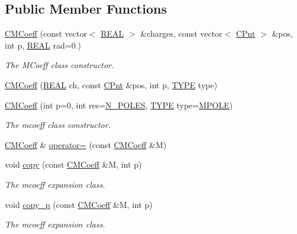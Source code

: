 \subsection*{Public Member Functions}
\begin{DoxyCompactItemize}
\item 
\hyperlink{classCMCoeff_aee6ebc4dd1ad9096babcaba957db66c7}{C\-M\-Coeff} (const vector$<$ \hyperlink{util_8h_a5821460e95a0800cf9f24c38915cbbde}{R\-E\-A\-L} $>$ \&charges, const vector$<$ \hyperlink{classCPnt}{C\-Pnt} $>$ \&pos, int p, \hyperlink{util_8h_a5821460e95a0800cf9f24c38915cbbde}{R\-E\-A\-L} rad=0.)
\begin{DoxyCompactList}\small\item\em The M\-Coeff class constructor. \end{DoxyCompactList}\item 
\hyperlink{classCMCoeff_a44f54126d3f90484420f1baf14ed491f}{C\-M\-Coeff} (\hyperlink{util_8h_a5821460e95a0800cf9f24c38915cbbde}{R\-E\-A\-L} ch, const \hyperlink{classCPnt}{C\-Pnt} \&pos, int p, \hyperlink{classCMCoeff_a0b490eeb5ba86bc1a95ea1c3b2946478}{T\-Y\-P\-E} type)
\item 
\hyperlink{classCMCoeff_a52820257419417dd2d18a75e276fd011}{C\-M\-Coeff} (int p=0, int res=\hyperlink{mcoeff_8h_ac23f9c13c5d07d9ce386f7a830c35e5a}{N\-\_\-\-P\-O\-L\-E\-S}, \hyperlink{classCMCoeff_a0b490eeb5ba86bc1a95ea1c3b2946478}{T\-Y\-P\-E} type=\hyperlink{classCMCoeff_a0b490eeb5ba86bc1a95ea1c3b2946478a44c2e68e32e879f210aab9493a0fb48d}{M\-P\-O\-L\-E})
\begin{DoxyCompactList}\small\item\em The mcoeff class constructor. \end{DoxyCompactList}\item 
\hyperlink{classCMCoeff}{C\-M\-Coeff} \& \hyperlink{classCMCoeff_a92c5e5e988695c301c47e3212930a68f}{operator=} (const \hyperlink{classCMCoeff}{C\-M\-Coeff} \&M)
\item 
void \hyperlink{classCMCoeff_a7010837883b56f9b972888bffb6fbb3d}{copy} (const \hyperlink{classCMCoeff}{C\-M\-Coeff} \&M, int p)
\begin{DoxyCompactList}\small\item\em The mcoeff expansion class. \end{DoxyCompactList}\item 
void \hyperlink{classCMCoeff_aba7b82a12360b0789af87a8dda74863b}{copy\-\_\-p} (const \hyperlink{classCMCoeff}{C\-M\-Coeff} \&M, int p)
\begin{DoxyCompactList}\small\item\em The mcoeff expansion class. \end{DoxyCompactList}\item 

\end{DoxyCompactItemize}
